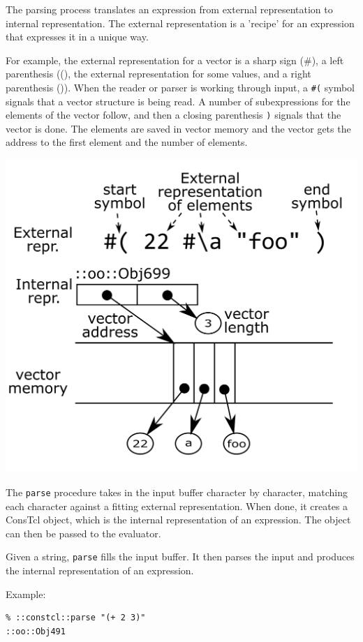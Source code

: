\documentclass[twoside,9pt]{report}
\begin{document}
The parsing process translates an expression from external representation to internal representation. The external representation is a 'recipe' for an expression that expresses it in a unique way.


For example, the external representation for a vector is a sharp sign (\#), a left parenthesis ((), the external representation for some values, and a right parenthesis ()). When the reader or parser is working through input, a \texttt{\#(} symbol signals that a vector structure is being read. A number of subexpressions for the elements of the vector follow, and then a closing parenthesis \texttt{)} signals that the vector is done. The elements are saved in vector memory and the vector gets the address to the first element and the number of elements.


\includegraphics{images/vector-representation}


The \texttt{parse} procedure takes in the input buffer character by character, matching each character against a fitting external representation. When done, it creates a ConsTcl object, which is the internal representation of an expression. The object can then be passed to the evaluator.


Given a string, \texttt{parse} fills the input buffer. It then parses the input and produces the internal representation of an expression.


Example:

\noindent\makebox[\linewidth]{\rule{\linewidth}{0.4pt}}
\begin{lstlisting}
% ::constcl::parse "(+ 2 3)"
::oo::Obj491
\end{lstlisting}
\noindent\makebox[\linewidth]{\rule{\linewidth}{0.4pt}}
\end{document}
